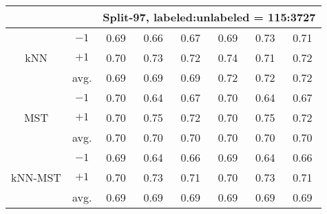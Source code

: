 \begin{table}[t!]
{\begin{tabular}{ c|c|ccc|ccc }
			\multicolumn{2}{c}{} & \multicolumn{6}{c}{Split-97, labeled:unlabeled = 115:3727}\\
			
			\hline
			\multirow{3}{*}{kNN} 
			& $-1$ & 0.69 & 0.66 & 0.67 & 0.69 & 0.73 & 0.71 \\
			& $+1$ & 0.70 & 0.73 & 0.72 & 0.74 & 0.71 & 0.72 \\
			\cline{2-8}
			& avg. & 0.69 & 0.69 & 0.69 & 0.72 & 0.72 & 0.72 \\
			\hline
			\multirow{3}{*}{MST} 
			& $-1$ & 0.70 & 0.64 & 0.67 & 0.70 & 0.64 & 0.67 \\
			& $+1$ & 0.70 & 0.75 & 0.72 & 0.70 & 0.75 & 0.72 \\
			\cline{2-8}
			& avg. & 0.70 & 0.70 & 0.70 & 0.70 & 0.70 & 0.70 \\
			\hline
			\multirow{3}{*}{kNN-MST} 
			& $-1$ & 0.69 & 0.64 & 0.66 & 0.69 & 0.64 & 0.66 \\
			& $+1$ & 0.70 & 0.73 & 0.71 & 0.70 & 0.73 & 0.71 \\
			\cline{2-8}
			& avg. & 0.69 & 0.69 & 0.69 & 0.69 & 0.69 & 0.69 \\
			\hline
	\end{tabular}}
\end{table}